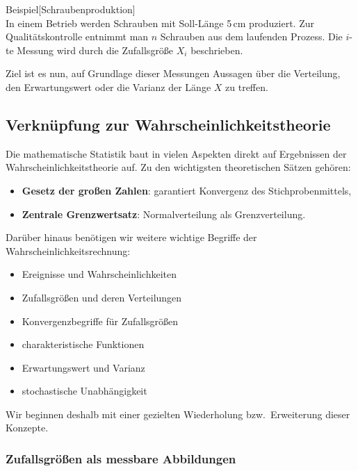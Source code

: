 \begin{colbox}{Beispiel}[Schraubenproduktion]\ \\
In einem Betrieb werden Schrauben mit Soll-Länge 5\,cm produziert. 
Zur Qualitätskontrolle entnimmt man $n$ Schrauben aus dem laufenden Prozess. 
Die $i$-te Messung wird durch die Zufallsgröße $X_i$ beschrieben.

Ziel ist es nun, auf Grundlage dieser Messungen Aussagen über die Verteilung, den Erwartungswert oder die Varianz 
der Länge $X$ zu treffen.
\end{colbox}

\subsection*{Verknüpfung zur Wahrscheinlichkeitstheorie}

Die mathematische Statistik baut in vielen Aspekten direkt auf Ergebnissen der Wahrscheinlichkeitstheorie auf. 
Zu den wichtigsten theoretischen Sätzen gehören:

\begin{itemize}
    \item \textbf{Gesetz der großen Zahlen}: garantiert Konvergenz des Stichprobenmittels,
    \item \textbf{Zentrale Grenzwertsatz}: Normalverteilung als Grenzverteilung.
\end{itemize}

Darüber hinaus benötigen wir weitere wichtige Begriffe der Wahrscheinlichkeitsrechnung:
\begin{itemize}
    \item Ereignisse und Wahrscheinlichkeiten
    \item Zufallsgrößen und deren Verteilungen
    \item Konvergenzbegriffe für Zufallsgrößen
    \item charakteristische Funktionen
    \item Erwartungswert und Varianz
    \item stochastische Unabhängigkeit
\end{itemize}

Wir beginnen deshalb mit einer gezielten Wiederholung bzw.\ Erweiterung dieser Konzepte.

\subsubsection*{Zufallsgrößen als messbare Abbildungen}


